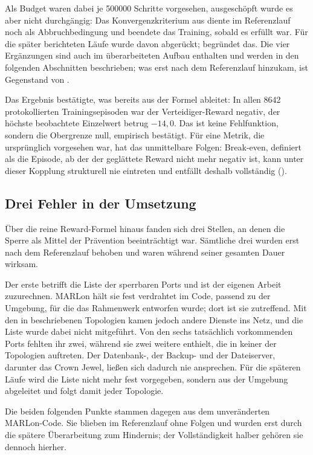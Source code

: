 Als Budget waren dabei je \num{500000} Schritte vorgesehen, ausgeschöpft wurde
es aber nicht durchgängig: Das Konvergenzkriterium aus 
diente im Referenzlauf noch als Abbruchbedingung und beendete das Training,
sobald es erfüllt war. Für die später berichteten Läufe wurde davon abgerückt;
 begründet das. Die vier Ergänzungen sind
auch im überarbeiteten Aufbau enthalten und werden in den folgenden
Abschnitten beschrieben; was erst nach dem Referenzlauf hinzukam, ist
Gegenstand von .

Das Ergebnis bestätigte, was  bereits aus der Formel
ableitet: In allen \num{8642} protokollierten Trainingsepisoden war der
Verteidiger-Reward negativ, der höchste beobachtete Einzelwert betrug
$-14{,}0$. Das ist keine Fehlfunktion, sondern die Obergrenze null, empirisch
bestätigt. Für eine Metrik, die ursprünglich vorgesehen war, hat das
unmittelbare Folgen: Break-even, definiert als die Episode, ab der der
geglättete Reward nicht mehr negativ ist, kann unter dieser Kopplung
strukturell nie eintreten und entfällt deshalb vollständig
().

\subsection{Drei Fehler in der Umsetzung}
\label{sec:marlon-fehler}

Über die reine Reward-Formel hinaus fanden sich drei Stellen, an denen die
Sperre als Mittel der Prävention beeinträchtigt war. Sämtliche drei wurden erst
nach dem Referenzlauf behoben und waren während seiner gesamten Dauer wirksam.

Der erste betrifft die Liste der sperrbaren Ports und ist der eigenen Arbeit
zuzurechnen. MARLon hält sie fest verdrahtet im Code, passend zu der
Umgebung, für die das Rahmenwerk entworfen wurde; dort ist sie zutreffend. Mit
den in  beschriebenen Topologien kamen jedoch andere
Dienste ins Netz, und die Liste wurde dabei nicht mitgeführt. Von den sechs
tatsächlich vorkommenden Ports fehlten ihr zwei, während sie zwei weitere
enthielt, die in keiner der Topologien auftreten. Der Datenbank-, der Backup-
und der Dateiserver, darunter das Crown Jewel, ließen sich dadurch nie
ansprechen. Für die späteren Läufe wird die Liste nicht mehr fest vorgegeben,
sondern aus der Umgebung abgeleitet und folgt damit jeder Topologie.

Die beiden folgenden Punkte stammen dagegen aus dem unveränderten
MARLon-Code. Sie blieben im Referenzlauf ohne Folgen und wurden erst durch
die spätere Überarbeitung zum Hindernis; der Vollständigkeit halber gehören sie
dennoch hierher.

